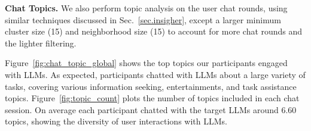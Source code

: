 \textbf{Chat Topics.} We also perform topic analysis on the user chat rounds, using similar techniques discussed in Sec.~\ref{sec.insigher}, except a larger minimum cluster size (15) and neighborhood size (15) to account for more chat rounds and the lighter filtering.

Figure~\ref{fig:chat_topic_global} shows the top topics our participants engaged with LLMs. 
As expected, participants chatted with LLMs about a large variety of tasks, covering various information seeking, entertainments, and task assistance topics. Figure~\ref{fig:topic_count} plots the number of topics included in each chat session. On average each participant chatted with the target LLMs around 6.60 topics, showing the diversity of user interactions with LLMs.









